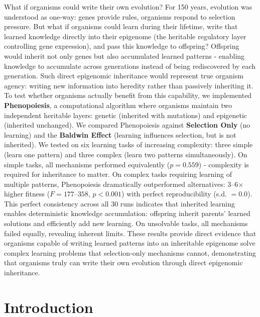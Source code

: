 \documentclass[11pt]{article}
\begin{document}
What if organisms could write their own evolution? For 150 years, evolution was understood as one-way: genes provide rules, organisms respond to selection pressure. But what if organisms could learn during their lifetime, write that learned knowledge directly into their epigenome (the heritable regulatory layer controlling gene expression), and pass this knowledge to offspring? Offspring would inherit not only genes but also accumulated learned patterns - enabling knowledge to accumulate across generations instead of being rediscovered by each generation. Such direct epigenomic inheritance would represent true organism agency: writing new information into heredity rather than passively inheriting it. To test whether organisms actually benefit from this capability, we implemented \textbf{Phenopoiesis}, a computational algorithm where organisms maintain two independent heritable layers: genetic (inherited with mutations) and epigenetic (inherited unchanged). We compared Phenopoiesis against \textbf{Selection Only} (no learning) and the \textbf{Baldwin Effect} (learning influences selection, but is not inherited). We tested on six learning tasks of increasing complexity: three simple (learn one pattern) and three complex (learn two patterns simultaneously). On simple tasks, all mechanisms performed equivalently ($p = 0.559$) - complexity is required for inheritance to matter. On complex tasks requiring learning of multiple patterns, Phenopoiesis dramatically outperformed alternatives: 3--6$\times$ higher fitness ($F = 177$--$358$, $p < 0.001$) with perfect reproducibility (s.d. $= 0.0$). This perfect consistency across all 30 runs indicates that inherited learning enables deterministic knowledge accumulation: offspring inherit parents' learned solutions and efficiently add new learning. On unsolvable tasks, all mechanisms failed equally, revealing inherent limits. These results provide direct evidence that organisms capable of writing learned patterns into an inheritable epigenome solve complex learning problems that selection-only mechanisms cannot, demonstrating that organisms truly can write their own evolution through direct epigenomic inheritance.

\newpage{}

\section*{Introduction}
\end{document}
